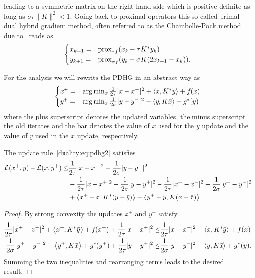 leading to a symmetric matrix on the right-hand side which is positive definite as long as $\sigma\tau \|K\|^2<1$.
Going back to proximal operators this so-called primal-dual hybrid gradient method, often referred to as the Chambolle-Pock method due to~\cite{chambolle2011first} reads as
\begin{equation}\label{duality:eq:pdhg}
    \begin{cases}
        x_{k+1} =& \mathrm{prox}_{\tau f}(x_k-\tau K^*y_k)\\
        y_{k+1} =& \mathrm{prox}_{\sigma f}(y_k+\sigma K(2x_{k+1}-x_k)).
    \end{cases}
\end{equation}

For the analysis we will rewrite the PDHG in an abstract way as
\begin{equation}\label{duality:eq:pdhg2}
    \begin{cases}
        x^+ =& \arg\min_x \frac{1}{2\tau}|x-x^-|^2 + \left\langle x , K^*\bar y\right\rangle + f(x)\\
        y^+ =& \arg\min_x \frac{1}{2\sigma}|y-y^-|^2 - \left\langle y , K\bar x\right\rangle + g^*(y)
    \end{cases}
\end{equation}
where the plus superscript denotes the updated variables, the minus superscript the old iterates and the bar denotes the value of $x$ used for the $y$ update and the value of $y$ used in the $x$ update, respectively.

\begin{lemma}
    The update rule~\eqref{duality:eq:pdhg2} satisfies
    \begin{equation}
        \begin{aligned}
            \mathcal{L}(x^+,y) - \mathcal{L}(x,y^+)\leq& \frac{1}{2\tau}|x-x^-|^2 + \frac{1}{2\sigma}|y-y^-|^2\\
            &-\frac{1}{2\tau}|x-x^+|^2 - \frac{1}{2\sigma}|y-y^+|^2
            -\frac{1}{2\tau}|x^+-x^-|^2 - \frac{1}{2\sigma}|y^+-y^-|^2\\
            &+\left\langle x^+-x , K^*(y-\bar{y})\right\rangle  - \left\langle y^+-y , K(x-\bar{x})\right\rangle.
        \end{aligned}
    \end{equation}
\end{lemma}
\begin{proof}
    By strong convexity the updates $x^+$ and $y^+$ satisfy
    \begin{equation}
        \begin{aligned}
            \frac{1}{2\tau}|x^+-x^-|^2 + \left\langle x^+ , K^*\bar y\right\rangle + f(x^+) + \frac{1}{2\tau}|x-x^+|^2
            \leq& \frac{1}{2\tau}|x-x^-|^2 + \left\langle x , K^*\bar y\right\rangle + f(x)\\
            \frac{1}{2\sigma}|y^+-y^-|^2 - \left\langle y^+ , K\bar x\right\rangle + g^*(y^+) + \frac{1}{2\tau}|y-y^+|^2
            \leq& \frac{1}{2\sigma}|y-y^-|^2 - \left\langle y , K\bar x\right\rangle + g^*(y).
        \end{aligned}
    \end{equation}
    Summing the two inequalities and rearranging terms leads to the desired result.
\end{proof}


